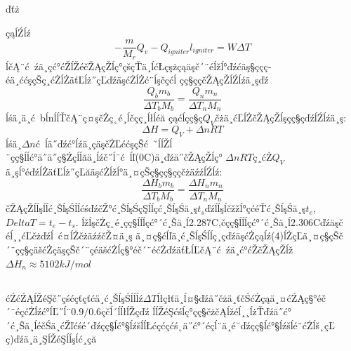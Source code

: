 ďťż\documentclass[10.5pt]{article}
\begin{document}
çąĺŹĺź
\begin{equation}
-\frac{m}{M_r}Q_v-Q_{igniter}l_{igniter}=W\Delta T
\end{equation}
ĺčĄ¨ć źä¸­çć°ćŽĺŽéčŽĄçŽĺç°çšçŤä¸ĺćŁçşżçąäşč´¨éĺžĺ°ďźćäş§ççç­éä¸ććşçŠç¸ćŻĺŻäťĽĺż˝çĽďźäşćŻĺŻć¨ĺşčçćĺ
çç§ç­çčŽĄçŽĺŹĺźä¸şďź
\begin{equation}
\frac{Q_b m_b}{\Delta T_b M_b}=\frac{Q_n m_n}{\Delta T_n M_n}
\end{equation}
ĺśä¸­ä¸ć bĺnĺĺŤčĄ¨ç¤şčŻç˛é¸ĺčçç¸ĺłĺéă
çąćĺçç§ç­$Q_V$čżä¸ć­ĽĺŻčŽĄçŽĺşçç§çďźĺŹĺźä¸ş:
\begin{equation}
\Delta H=Q_V+\Delta n R T
\end{equation}
ĺśä¸­$\Delta n$ć ĺä˝ďźć°ĺźä¸ç­äşčŻĽććşçŠć ˇĺĺŽĺ¨çç§ĺĺć°ä˝ä˝ç§Żçĺĺăä¸ĺźč˝ĺ¨ć ĺľ(0\degree C)ä¸ďźä˝čŽĄçŽĺç° $\Delta n RT$ç¸ćŻ$Q_V$ä¸şĺ°éďźĺŻäťĽĺż˝çĽăäşćŻĺžĺ°ä¸¤çŠç§çç§ççčżäźźĺŹĺź:
\begin{equation}
\frac{{\Delta H}_b m_b}{\Delta T_b M_b}=\frac{{\Delta H}_n m_n}{\Delta T_n M_n}
\end{equation}
čŽĄçŽĺĺşĺĺć¸ŠĺşŚĺĺćśďźčŽ°ć¸ŠĺşŚçŞĺĺçć¸ŠĺşŚä¸ş$t_s$ďźĺĺşĺčžžĺ°çćéŤć¸ŠĺşŚä¸ş$t_e$,$Delta T=t_e-t_s$.
ĺžĺşčŻç˛é¸çç§ĺĺĺç­ć°´ć¸Šä¸ĺ2.287\degree C,čçç§ĺĺĺç­ć°´ć¸Šä¸ĺ2.306\degree Cďźäşčéĺ¸¸ćĽčżďźĺ ć­¤ĺŻčżäźźčŽ¤ä¸ş
ä¸¤ç§ćĺľä¸ć¸ŠĺşŚĺĺç¸ç­ďźäşćŻçąĺź(4)ĺŻçĽä¸¤ç§çŠč´¨çç§çäšćŻç­äşçŠč´¨çéäšćŻĺç§°éč´¨éćŻďźäťŁĺĽčĄ¨ć źä¸­ć°ćŽčŽĄçŽĺž
${\Delta H}_n \approx 5102 kJ/mol $

\subsection{\textbf{}}
ćŹćŹĄĺŽéŞč˝çśćçťçťćä¸ć¸ŠĺşŚĺĺĺź$\Delta T$ĺłçłťä¸ĺ¤§ďźä˝čżä¸ťčŚćŻçąä¸¤ćŹĄç§°éč´¨éçćŻĺźć°ĺĽ˝ĺ¨$0.9/0.6$çčĺ´ĺĺłĺŽçďź
ĺĺŽéŞćśĺç°çç§čżčĄĺžéĺ¸¸ĺżŤďźä˝ć°´ć¸Šä¸ĺéčŚä¸ćŽľćśé´ďźçç§ĺć°§ĺźšĺĺŁćçćçćś˛ä˝ć°´éçĺ¨ä¸é˘ďźçç§ĺć°§ĺźšĺé¨ćŻĺš˛çĽ
ç)ďźä¸ä¸ŞĺŽéŞĺĺşĺć¸çă

\section{\textbf{}}
\end{document}
